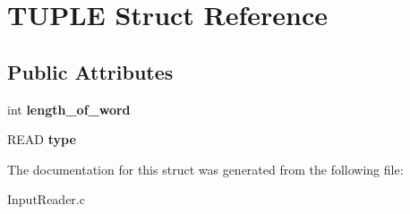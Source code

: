 \hypertarget{struct_t_u_p_l_e}{}\section{T\+U\+P\+L\+E Struct Reference}
\label{struct_t_u_p_l_e}
\subsection*{Public Attributes}
\begin{DoxyCompactItemize}
\item 
\hypertarget{struct_t_u_p_l_e_a0ede5ae728ed086ff7dd92dd7b89c758}{}int {\bfseries length\+\_\+of\+\_\+word}\label{struct_t_u_p_l_e_a0ede5ae728ed086ff7dd92dd7b89c758}

\item 
\hypertarget{struct_t_u_p_l_e_a9ab7d033c78446a7114f4b3727ca7958}{}R\+E\+A\+D {\bfseries type}\label{struct_t_u_p_l_e_a9ab7d033c78446a7114f4b3727ca7958}

\end{DoxyCompactItemize}


The documentation for this struct was generated from the following file\+:\begin{DoxyCompactItemize}
\item 
Input\+Reader.\+c\end{DoxyCompactItemize}
